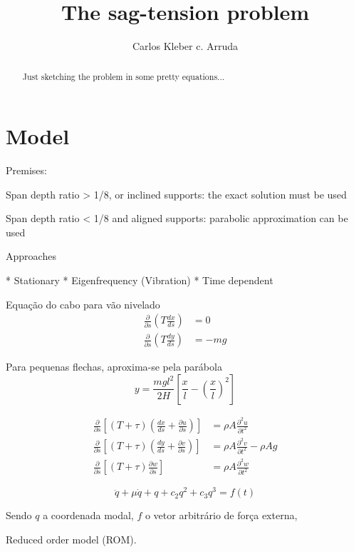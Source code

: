 \documentclass[]{article}
\title{The sag-tension problem}
\author{Carlos Kleber c. Arruda}
\begin{document}
\maketitle

\begin{abstract}
Just sketching the problem in some pretty equations...
\end{abstract}

\section{Model}

Premises:

Span depth ratio > 1/8, or inclined supports: the exact solution must be used

Span depth ratio < 1/8 and aligned supports: parabolic approximation can be used

Approaches

* Stationary
* Eigenfrequency (Vibration)
* Time dependent

Equação do cabo para vão nivelado
%
\begin{align}
	\frac{\partial}{\partial s} \left( T \frac{dx}{ds}\right) & = 0 \\
	\frac{\partial}{\partial s} \left( T \frac{dy}{ds}\right) & = -mg
\end{align}

Para pequenas flechas, aproxima-se pela parábola
%
\begin{equation}
	y = \frac{m g l^2}{2 H} \left[ \frac{x}{l} - \left( \frac{x}{l} \right)^2 \right]
\end{equation}


\begin{align}
	\frac{\partial}{\partial s} \left[ (T + \tau) \left( \frac{dx}{ds} + \frac{\partial u}{\partial s}\right) \right] & = \rho A \frac{\partial^2 u}{\partial t^2} \\
	\frac{\partial}{\partial s} \left[ (T + \tau) \left( \frac{dy}{ds} + \frac{\partial v}{\partial s}\right)\right] & = \rho A \frac{\partial^2 v}{\partial t^2} -\rho A g \\
	\frac{\partial}{\partial s} \left[ (T + \tau) \frac{\partial w}{\partial s} \right] & = \rho A \frac{\partial^2 w}{\partial t^2}	
\end{align}


\begin{equation}
	\ddot{q} + \mu \dot{q} + q + c_2 q^2 + c_3 q^3 = f(t)
\end{equation}

Sendo $q$ a coordenada modal, $f$ o vetor arbitrário de força externa, 

Reduced order model (ROM).
\end{document}
